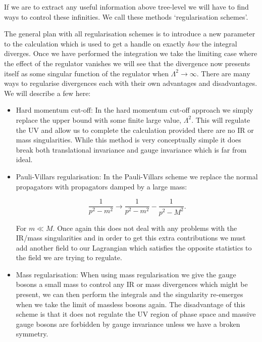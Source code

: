 	If we are to extract any useful information above tree-level we will have to find
	ways to control these infinities.  We call these methods `regularisation schemes'.

	The general plan with all regularisation schemes is to introduce a new parameter to the calculation which
	is used to get a handle on exactly \emph{how} the integral diverges.  Once we have performed the integration
	we take the limiting case where the effect of the regulator vanishes we will see that the divergence now
	presents itself as some singular function of the regulator when $\Lambda^2\rightarrow\infty$.  There are
	many ways to regularise divergences each with their own advantages and disadvantages.  We will describe a few here:

	\begin{itemize}
		\item Hard momentum cut-off: In the hard momentum cut-off approach we simply replace the upper bound
		with some finite large value, $\Lambda^2$.  This will regulate the UV and allow us to complete the
		calculation provided there are no IR or mass singularities.  While this method is very conceptually
		simple it does break both translational invariance and gauge invariance which is far from ideal.

		\item Pauli-Villars regularisation: In the Pauli-Villars scheme we replace the normal propagators with propagators damped by a large mass:

		      \begin{equation}
			      \frac{1}{p^2-m^2}\rightarrow\frac{1}{p^2-m^2} - \frac{1}{p^2-M^2}.
		      \end{equation}

		      For $m\ll M$.  Once again this does not deal with any problems with the IR/mass singularities and in order to get this
		      extra contributions we must add another field to our Lagrangian which satisfies the opposite statistics to the field we are trying to regulate.

		\item Mass regularisation: When using mass regularisation we give the gauge bosons a small mass to control any
		IR or mass divergences which might be present, we can then perform the integrals and the singularity re-emerges
		when we take the limit of massless bosons again.  The disadvantage of this scheme is that it does not regulate
		the UV region of phase space and massive gauge bosons are forbidden by gauge invariance unless we have a broken symmetry.


\end{itemize}
